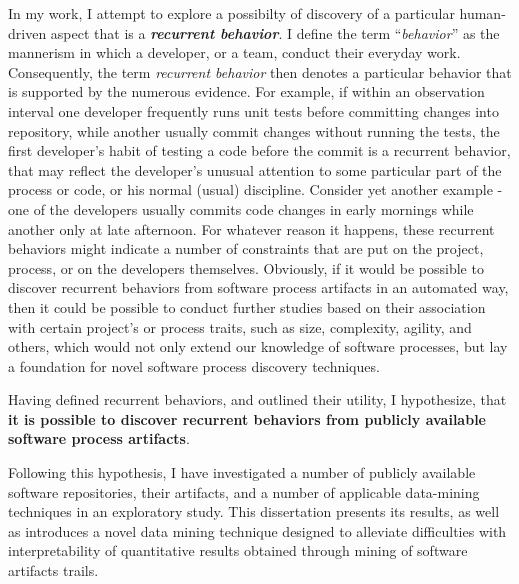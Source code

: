 In my work, I attempt to explore a possibilty of discovery of a particular human-driven aspect that is a 
\textit{\textbf{recurrent behavior}}. 
I define the term ``\textit{behavior}'' as the mannerism in which a developer, or a team, conduct 
their everyday work. Consequently, the term \textit{recurrent behavior} then denotes a particular 
behavior that is supported by the numerous evidence. 
For example, if within an observation interval one developer frequently runs unit tests before committing 
changes into repository, while another usually commit changes without running the tests, the first developer's
habit of testing a code before the commit is a recurrent behavior, that may reflect the developer's unusual 
attention to some particular part of the process or code, or his normal (usual) discipline. 
Consider yet another example - one of the developers usually commits code changes in early mornings while 
another only at late afternoon. For whatever reason it happens, these recurrent behaviors might indicate 
a number of constraints that are put on the project, process, or on the developers themselves.
Obviously, if it would be possible to discover recurrent behaviors from software process artifacts in an
automated way, then it could be possible to conduct further studies based on their association with 
certain project's or process traits, such as size, complexity, agility, and others, which would not only 
extend our knowledge of software processes, but lay a foundation for novel software process discovery techniques.

Having defined recurrent behaviors, and outlined their utility, I hypothesize, 
that \textbf{it is possible to discover recurrent behaviors from publicly available software process artifacts}. 

Following this hypothesis, I have investigated a number of publicly available software repositories,
their artifacts, and a number of applicable data-mining techniques in an exploratory study.
This dissertation presents its results, as well as introduces a novel data mining technique designed to 
alleviate difficulties with interpretability of quantitative results obtained through mining of software
artifacts trails. 

%
%
